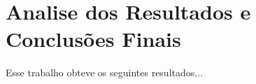 \chapter{Analise dos Resultados e Conclusões Finais}\label{cap:apresAnaRes}

Esse trabalho obteve os seguintes resultados... 







